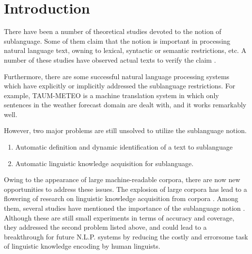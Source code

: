 


\maketitle

\section{Introduction}

 There have been a number of theoretical studies devoted to the notion of
sublanguage.
Some of them claim that the notion is important in processing
natural language text, owning to lexical, syntactic or semantic restrictions, etc.
A number of these studies have observed actual texts to verify the claim
\cite{Kittredge:82} 
\cite{Grishman:86}
\cite{Slocum:86}
\cite{Biber:93}.

  Furthermore, there are some successful natural language
processing systems which have explicitly or implicitly addressed
the sublanguage restrictions. 
For example, TAUM-METEO \cite{Isabelle:84} is a machine translation system
in which only sentences in the weather forecast domain are dealt with, 
and it works remarkably well.

However, two major problems are still unsolved to utilize the sublanguage notion.

\begin{enumerate}

\item Automatic definition and dynamic identification of a text to sublanguage
\item Automatic linguistic knowledge acquisition for sublanguage.

\end{enumerate}

Owing to the appearance of large machine-readable corpora,
there are now new opportunities to address these issues.
The explosion of large corpora has lead to a flowering of research on
linguistic knowledge acquisition from corpora 
\cite{Special_Issue:93a} \cite{Special_Issue:93b}.
Among them, several studies have mentioned the
importance of the sublanguage notion 
\cite{Grishman:92} \cite{Sekine:92}.
Although these are still small experiments in terms of accuracy and
coverage,
they addressed the second problem listed above, 
and could lead to a breakthrough
for future N.L.P. systems by reducing the costly
and errorsome task of linguistic knowledge encoding by human linguists.

